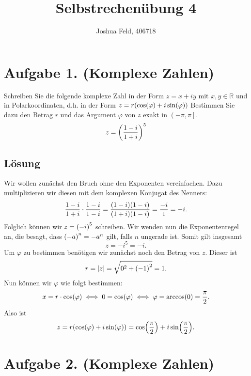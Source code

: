 \documentclass[german,12pt]{homework}
\title{Selbstrechenübung 4}
\author{Joshua Feld, 406718}
\institute{RWTH Aachen University\\Center for Computational Engineering Science}
\DeclarePairedDelimiter{\absolute}{\lvert}{\rvert}
\DeclarePairedDelimiter{\enbrace}{(}{)}
\begin{document}
    \maketitle

    \section*{Aufgabe 1. (Komplexe Zahlen)}

    \begin{problem}
        Schreiben Sie die folgende komplexe Zahl in der Form \(z = x + iy\) mit \(x, y \in \mathbb{R}\) und in Polarkoordinaten, d.h. in der Form \(z = r\enbrace*{\cos\enbrace*{\varphi} + i\sin\enbrace*{\varphi}}\) Bestimmen Sie dazu den Betrag \(r\) und das Argument \(\varphi\) von \(z\) exakt in \(\left(-\pi, \pi\right]\).
        \[z = \enbrace*{\frac{1 - i}{1 + i}}^5\]
    \end{problem}

    \subsection*{Lösung} Wir wollen zunächst den Bruch ohne den Exponenten vereinfachen. Dazu multiplizieren wir diesen mit dem komplexen Konjugat des Nenners:
    \[\frac{1 - i}{1 + i} \cdot \frac{1 - i}{1 - i} = \frac{\enbrace*{1 - i}\enbrace*{1 - i}}{\enbrace*{1 + i}\enbrace*{1 - i}} = \frac{-i}{1} = -i.\]
    Folglich können wir \(z = \enbrace*{-i}^5\) schreiben. Wir wenden nun die Exponentenregel an, die besagt, dass \(\enbrace*{-a}^n = -a^n\) gilt, falls \(n\) ungerade ist. Somit gilt insgesamt
    \[z = -i^5 = -i.\]
    Um \(\varphi\) zu bestimmen benötigen wir zunächst noch den Betrag von \(z\). Dieser ist
    \[r = \absolute*{z} = \sqrt{0^2 + \enbrace*{-1}^2} = 1.\]
    Nun können wir \(\varphi\) wie folgt bestimmen:
    \[x = r \cdot \cos\enbrace*{\varphi} \iff 0 = \cos\enbrace*{\varphi} \iff \varphi = \arccos\enbrace*{0} = \frac{\pi}{2}.\]
    Also ist
    \[z = r\enbrace*{\cos\enbrace*{\varphi} + i\sin\enbrace*{\varphi}} = \cos\enbrace*{\frac{\pi}{2}} + i\sin\enbrace*{\frac{\pi}{2}}.\]

    \section*{Aufgabe 2. (Komplexe Zahlen)}
\end{document}
